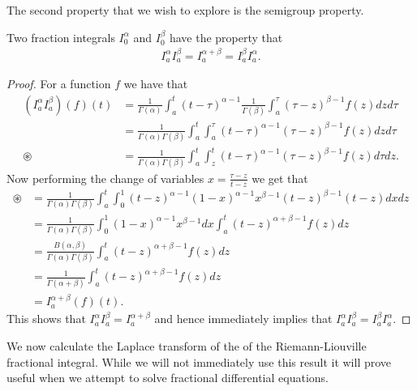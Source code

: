 The second property that we wish to explore is the semigroup property.
\begin{mdframed}[innertopmargin=10pt]
\begin{lemma}
    Two fraction integrals $ I_0^\alpha $ and $ I_0^\beta $ have the property that
    \begin{align}
        I_a^\alpha I_a^\beta = I_a^{\alpha + \beta} = I_a^\beta I_a^\alpha.
    \end{align}
\end{lemma}
\end{mdframed}
\begin{proof}
    For a function $ f $ we have that
    \begin{align}
        (I_a^\alpha I_a^\beta)(f)(t) &= \frac{1}{\Gamma(\alpha)}\int_a^t (t-\tau)^{\alpha - 1}  \frac{1}{\Gamma(\beta)}\int_a^\tau (\tau - z)^{\beta - 1}f(z) dz d\tau \\
            &=\frac{1}{\Gamma(\alpha)\Gamma(\beta)} \int_a^t \int_a^\tau  (t-\tau)^{\alpha - 1}(\tau - z)^{\beta - 1}f(z) dz d\tau \\
            \circledast  &= \frac{1}{\Gamma(\alpha)\Gamma(\beta)} \int_a^t \int_z^t (t-\tau)^{\alpha - 1} (\tau - z)^{\beta - 1} f(z) d\tau dz.
    \end{align}
    Now performing the change of variables $ x = \frac{\tau - z}{t - z} $ we get that
    \begin{align}
        \circledast
        &= \frac{1}{\Gamma(\alpha)\Gamma(\beta)}\int_a^t \int_0^1 (t-z)^{\alpha - 1} (1-x)^{\alpha-1} x^{\beta - 1} (t-z)^{\beta - 1}(t-z) dx dz \\
        &= \frac{1}{\Gamma(\alpha)\Gamma(\beta)}\int_0^1 (1-x)^{\alpha - 1} x^{\beta - 1} dx \int_a^t (t-z)^{\alpha + \beta - 1} f(z) dz \\
        &= \frac{B(\alpha,\beta)}{\Gamma(\alpha)\Gamma(\beta)} \int_a^t (t-z)^{\alpha + \beta - 1} f(z) dz \\
        &= \frac{1}{\Gamma(\alpha + \beta)} \int_a^t (t-z)^{\alpha + \beta - 1} f(z) dz \\
        &= I_a^{\alpha + \beta}(f)(t).
    \end{align}
    This shows that $ I_a^\alpha I_a^\beta = I_a^{\alpha + \beta} $ and hence immediately implies that $ I_a^\alpha I_a^\beta = I_a^\beta I_a^\alpha $.
\end{proof}
We now calculate the Laplace transform of the of the Riemann-Liouville fractional integral. While we will not immediately use this result it will prove useful when we attempt to solve fractional differential equations.
